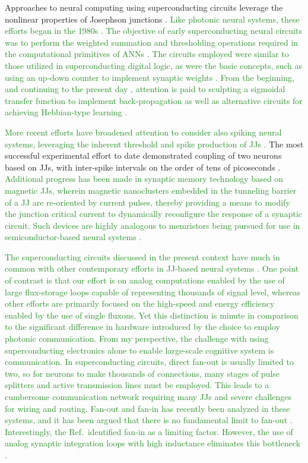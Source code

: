 \documentclass[twocolumn]{article}
\begin{document}
Approaches to neural computing using superconducting circuits leverage the nonlinear properties of Josephson junctions \cite{hias2007,sele2017,scdo2018}. \textcolor{ForestGreen}{Like photonic neural systems, these efforts began in the 1980s \cite{ai1989,og1989}. The objective of early superconducting neural circuits was to perform the weighted summation and thresholding operations required in the computational primitives of ANNs \cite{hago1991,hiak1991}. The circuits employed were similar to those utilized in superconducting digital logic, as were the basic concepts, such as using an up-down counter to implement synaptic weights \cite{hiak1991}. From the beginning, and continuing to the present day \cite{sckl2016,klsc2018,sosc2018}, attention is paid to sculpting a sigmoidal transfer function to implement back-propagation as well as alternative circuits for achieving Hebbian-type learning \cite{hago1991}.} 

\textcolor{ForestGreen}{More recent efforts have broadened attention to consider also spiking neural systems, leveraging the inherent threshold and spike production of JJs \cite{crsc2010,scdo2018}.}  The most successful experimental effort to date demonstrated coupling of two neurons based on JJs, with inter-spike intervals on the order of tens of picoseconds \cite{sele2017}. \textcolor{ForestGreen}{Additional progress has been made in synaptic memory technology based on magnetic JJs, wherein magnetic nanoclusters embedded in the tunneling barrier of a JJ are re-oriented by current pulses, thereby providing a means to modify the junction critical current \cite{scdo2020} to dynamically reconfigure the response of a synaptic circuit. Such devices are highly analogous to memristors being pursued for use in semiconductor-based neural systems \cite{kiha2018}.} 

\textcolor{ForestGreen}{The superconducting circuits discussed in the present context have much in common with other contemporary efforts in JJ-based neural systems \cite{crsc2010}. One point of contrast is that our effort is on analog computations enabled by the use of large flux-storage loops capable of representing thousands of signal level, whereas other efforts are primarily focused on the high-speed and energy efficiency enabled by the use of single fluxons. Yet this distinction is minute in comparison to the significant difference in hardware introduced by the choice to employ photonic communication. From my perspective, the challenge with using superconducting electronics alone to enable large-scale cognitive system is communication. In superconducting circuits, direct fan-out is usually limited to two, so for neurons to make thousands of connections, many stages of pulse splitters and active transmission lines must be employed. This leads to a cumbersome communication network requiring many JJs and severe challenges for wiring and routing. Fan-out and fan-in has recently been analyzed in these systems, and it has been argued that there is no fundamental limit to fan-out \cite{scse2020}. Interestingly, the Ref.\,\cite{scse2020} identified fan-in as a limiting factor. However, the use of analog synaptic integration loops with high inductance eliminates this bottleneck \cite{sh2019}.}
\end{document}

